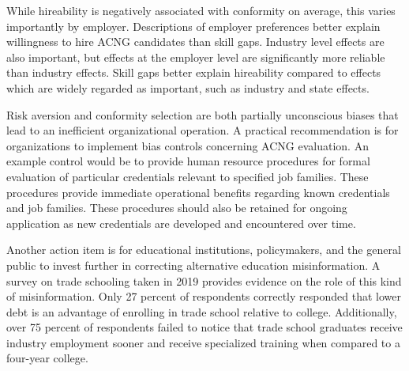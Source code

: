 \documentclass[review]{elsarticle}
\begin{document}
While hireability is negatively associated with conformity on average, this varies importantly by employer.
Descriptions of employer preferences better explain willingness to hire ACNG candidates than skill gaps.
Industry level effects are also important, but effects at the employer level are significantly more reliable than industry effects.
Skill gaps better explain hireability compared to effects which are widely regarded as important,
such as industry and state effects.


Risk aversion and conformity selection are both partially unconscious biases that lead to an inefficient organizational operation.
A practical recommendation is for organizations to implement bias controls concerning ACNG evaluation.
An example control would be to provide human resource procedures for formal evaluation of particular credentials relevant to specified job families.
These procedures provide immediate operational benefits regarding known credentials and job families.
These procedures should also be retained for ongoing application as new credentials are developed and encountered over time.

Another action item is for educational institutions, policymakers, and the general public to invest further in correcting alternative education misinformation.
A survey on trade schooling taken in 2019 provides evidence on the role of this kind of misinformation\cite{arabia_2019}.
Only 27 percent of respondents correctly responded that lower debt is an advantage of enrolling in trade school relative to college.
Additionally, over 75 percent of respondents failed to notice that trade school graduates receive industry employment sooner
and receive specialized training when compared to a four-year college.
\end{document}
